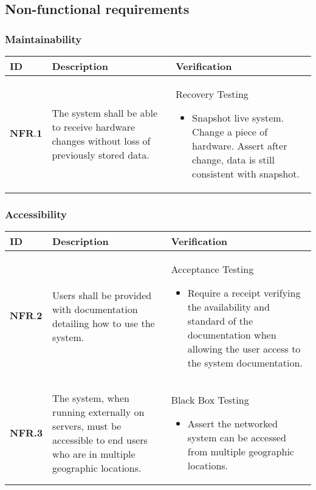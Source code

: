 \subsection{Non-functional requirements}

\subsubsection{Maintainability}
\begin{longtable}[H]{|p{1.5cm}|p{4.5cm}|p{10.5cm}|}
    \hline
    \cellcolor{titleColor}\textbf{ID} & \cellcolor{titleColor}\textbf{Description} & \cellcolor{titleColor}\textbf{Verification} \\ \hline
   $ \textbf{NFR.1} $ & The system shall be able to receive hardware changes without loss of previously stored data. & Recovery Testing\begin{itemize}\item Snapshot live system. Change a piece of hardware. Assert after change, data is still consistent with snapshot.\end{itemize} \\ \hline
\end{longtable}

\subsubsection{Accessibility}
\begin{longtable}[H]{|p{1.5cm}|p{4.5cm}|p{10.5cm}|}
    \hline
    \cellcolor{titleColor}\textbf{ID} & \cellcolor{titleColor}\textbf{Description} & \cellcolor{titleColor}\textbf{Verification} \\ \hline
    $ \textbf{NFR.2} $ & Users shall be provided with documentation detailing how to use the system. & Acceptance Testing\begin{itemize}\item Require a receipt verifying the availability and standard of the documentation when allowing the user access to the system documentation.\end{itemize} \\ \hline
    \textbf{NFR.3} & The system, when running externally on servers, must be accessible to end users who are in multiple geographic locations. & Black Box Testing\begin{itemize}\item Assert the networked system can be accessed from multiple geographic locations.\end{itemize} \\ \hline
\end{longtable}

